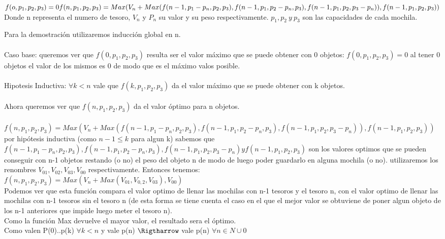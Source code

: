 \documentclass[spanish,12pt]{article}
\begin{document}
$f(o,p_{1},p_{2},p_{3})=0 \\
f(n,p_{1},p_{2},p_{3}) = Max(V_{n}+Max(f(n-1,p_{1}-p_{n},p_{2},p_{3}), f(n-1,p_{1},p_{2}-p_{n},p_{3}), f(n-1,p_{1},p_{2},p_{3}-p_{n})),f(n-1,p_{1},p_{2},p_{3})) $
\\
Donde n representa el numero de tesoro, $V_{n}$ y $P_{n}$ su valor y su peso respectivamente. $p_{1},p_{2}\ y \ p_{3}$ son las capacidades de cada mochila.

Para la demostración utilizaremos inducción global en n.
\\
\\
Caso base: queremos ver que $f(0,p_{1},p_{2},p_{3})$ resulta ser el valor máximo que se puede obtener con 0 objetos:
$f(0,p_{1},p_{2},p_{3}) = 0$ al tener 0 objetos el valor de los mismos es 0 de modo que es el máximo valos posible.
\\
\\
Hipotesis Inductiva: $\forall k<n$ vale que $f(k,p_{1},p_{2},p_{3})$ da el valor máximo que se puede obtener con k objetos.
\\
\\
Ahora queremos ver que $f(n,p_{1},p_{2},p_{3})$ da el valor óptimo para n objetos.
\\
\\
$f(n,p_{1},p_{2},p_{3}) = Max(V_{n}+Max(f(n-1,p_{1}-p_{n},p_{2},p_{3}), f(n-1,p_{1},p_{2}-p_{n},p_{3}), f(n-1,p_{1},p_{2},p_{3}-p_{n})),f(n-1,p_{1},p_{2},p_{3})) $ \\
por hipótesis inductiva (como $n-1 \leq k$ para algun k) sabemos que $f(n-1,p_{1}-p_{n},p_{2},p_{3}), f(n-1,p_{1},p_{2}-p_{n},p_{3}), f(n-1,p_{1},p_{2},p_{3}-p_{n}) y f(n-1,p_{1},p_{2},p_{3})$ son los valores optimos que se pueden conseguir con n-1 objetos restando (o no) el peso del objeto n de modo de luego poder guardarlo en alguna mochila (o no). utilizaremos los renombres $V_{01},V_{02},V_{03},V_{00}$ respectivamente.
Entonces tenemos: \\
$f(n,p_{1},p_{2},p_{3})= Max(V_{n}+Max(V_{01},V_{0,2},V_{03}),V_{00})$\\
Podemos ver que esta función  compara el valor optimo de llenar las mochilas con n-1 tesoros y el tesoro n, con el valor optimo de llenar las mochilas con n-1 tesoros sin el tesoro n (de esta forma se tiene cuenta el caso en el que el mejor valor se obtuviene de poner algun objeto  de los n-1 anteriores que impide luego meter el tesoro n).\\
Como la función Max devuelve el mayor valor, el resultado sera el óptimo.
\\
Como valen P(0)..p(k) $\forall k<n$ y vale p(n) $\Rigtharrow$ vale p(n) $\forall n \in N \cup {0} $
\end{document}
